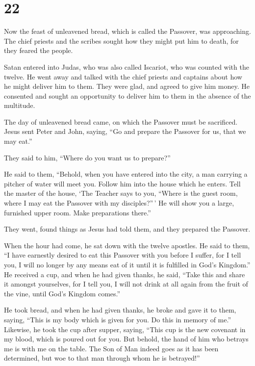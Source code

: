 \hypertarget{section-21}{%
\section{22}\label{section-21}}

 Now the feast of unleavened bread, which is called the
Passover, was approaching.  The chief priests and the
scribes sought how they might put him to death, for they feared the
people.

 Satan entered into Judas, who was also called Iscariot, who
was counted with the twelve.  He went away and talked with
the chief priests and captains about how he might deliver him to them.
 They were glad, and agreed to give him money. 
He consented and sought an opportunity to deliver him to them in the
absence of the multitude.

 The day of unleavened bread came, on which the Passover
must be sacrificed.  Jesus sent Peter and John, saying, ``Go
and prepare the Passover for us, that we may eat.''

 They said to him, ``Where do you want us to prepare?''

 He said to them, ``Behold, when you have entered into the
city, a man carrying a pitcher of water will meet you. Follow him into
the house which he enters.  Tell the master of the house,
`The Teacher says to you, ``Where is the guest room, where I may eat the
Passover with my disciples?''\,'  He will show you a large,
furnished upper room. Make preparations there.''

 They went, found things as Jesus had told them, and they
prepared the Passover.

 When the hour had come, he sat down with the twelve
apostles.  He said to them, ``I have earnestly desired to
eat this Passover with you before I suffer,  for I tell
you, I will no longer by any means eat of it until it is fulfilled in
God's Kingdom.''  He received a cup, and when he had given
thanks, he said, ``Take this and share it amongst yourselves,
 for I tell you, I will not drink at all again from the
fruit of the vine, until God's Kingdom comes.''

 He took bread, and when he had given thanks, he broke and
gave it to them, saying, ``This is my body which is given for you. Do
this in memory of me.''  Likewise, he took the cup after
supper, saying, ``This cup is the new covenant in my blood, which is
poured out for you.  But behold, the hand of him who
betrays me is with me on the table.  The Son of Man indeed
goes as it has been determined, but woe to that man through whom he is
betrayed!''

